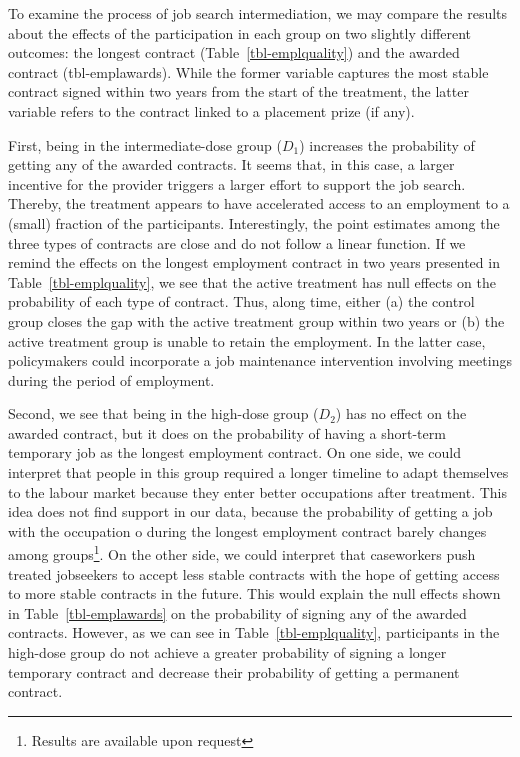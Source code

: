 \documentclass[
  11pt]{article}
\begin{document}
To examine the process of job search intermediation, we may compare the
results about the effects of the participation in each group on two
slightly different outcomes: the longest contract
(Table~\ref{tbl-emplquality}) and the awarded contract (tbl-emplawards).
While the former variable captures the most stable contract signed
within two years from the start of the treatment, the latter variable
refers to the contract linked to a placement prize (if any).

First, being in the intermediate-dose group (\(D_1\)) increases the
probability of getting any of the awarded contracts. It seems that, in
this case, a larger incentive for the provider triggers a larger effort
to support the job search. Thereby, the treatment appears to have
accelerated access to an employment to a (small) fraction of the
participants. Interestingly, the point estimates among the three types
of contracts are close and do not follow a linear function. If we remind
the effects on the longest employment contract in two years presented in
Table~\ref{tbl-emplquality}, we see that the active treatment has null
effects on the probability of each type of contract. Thus, along time,
either (a) the control group closes the gap with the active treatment
group within two years or (b) the active treatment group is unable to
retain the employment. In the latter case, policymakers could
incorporate a job maintenance intervention involving meetings during the
period of employment.

Second, we see that being in the high-dose group (\(D_2\)) has no effect
on the awarded contract, but it does on the probability of having a
short-term temporary job as the longest employment contract. On one
side, we could interpret that people in this group required a longer
timeline to adapt themselves to the labour market because they enter
better occupations after treatment. This idea does not find support in
our data, because the probability of getting a job with the occupation o
during the longest employment contract barely changes among
groups\footnote{Results are available upon request}. On the other side,
we could interpret that caseworkers push treated jobseekers to accept
less stable contracts with the hope of getting access to more stable
contracts in the future. This would explain the null effects shown in
Table~\ref{tbl-emplawards} on the probability of signing any of the
awarded contracts. However, as we can see in
Table~\ref{tbl-emplquality}, participants in the high-dose group do not
achieve a greater probability of signing a longer temporary contract and
decrease their probability of getting a permanent contract.
\end{document}
